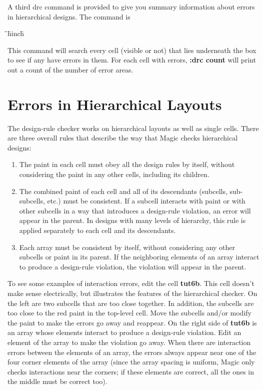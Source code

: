 \documentclass[letterpaper,twoside,12pt]{article}
\def\hinch{\hspace*{0.5in}}
\def\starti{\begin{center}\begin{tabbing}\hinch\=\hinch\=\hinch\=hinch\hinch\=\kill}
\def\endi{\end{tabbing}\end{center}}
\def\ii{\>\>\>}
\begin{document}
A third drc command is provided to give you summary information
about errors in hierarchical designs.  The command is

\starti
   \ii {\bfseries :drc count}
\endi

This command will search every cell (visible or not) that
lies underneath the box to see if any have errors in them.
For each cell with errors, {\bfseries :drc count} will print out
a count of the number of error areas.


\section{Errors in Hierarchical Layouts}

The design-rule checker works on hierarchical layouts as well
as single cells.  There are three overall rules that describe the
way that Magic checks hierarchical designs:

\begin{enumerate}
  \item	The paint in each cell must obey all the design rules by itself,
	without considering the paint in any other cells, including
	its children.

  \item	The combined paint of each cell and all of its descendants
	(subcells, sub-subcells, etc.) must be consistent.  If a
	subcell interacts with paint or with other subcells in a way
	that introduces a design-rule violation, an error will appear
	in the parent.  In designs with many levels of
	hierarchy, this rule is applied separately to each
	cell and its descendants.

  \item	Each array must be consistent by itself, without considering
	any other subcells or paint in its parent.  If the neighboring
	elements of an array interact to produce a design-rule violation,
	the violation will appear in the parent.
\end{enumerate}

To see some examples of interaction errors, edit the cell
{\bfseries tut6b}.  This cell doesn't make sense electrically,
but illustrates the features of the hierarchical checker.
On the left are two subcells that are
too close together.  In addition, the subcells are too close to
the red paint in the top-level cell.  Move the subcells and/or
modify the paint to make the
errors go away and reappear.  On the right side of {\bfseries tut6b} is
an array whose elements interact to produce a design-rule
violation.  Edit an element of the array to make the
violation go away.  When there are interaction errors between
the elements of an array, the errors always appear near one of the
four corner elements of the array (since the array spacing is uniform,
Magic only checks interactions near the corners;  if these
elements are correct, all the ones in the middle must be correct
too).
\end{document}
